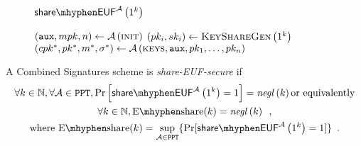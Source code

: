   \begin{figure}[!htbp]
    \begin{gamebox}{$\mathsf{share \mhyphen
    EUF}^{\adversary}\left(1^k\right)$}
      \begin{algorithmic}[1]
        \State $\left(\mathtt{aux}, mpk, n\right) \gets
        \mathcal{A}\left(\textsc{init}\right)$
          \State $\left(pk_i, sk_i\right) \gets
          \textsc{KeyShareGen}\left(1^k\right)$
        \EndFor
        \State $\left(cpk^*, pk^*, m^*, \sigma^*\right) \gets
        \mathcal{A}\left(\textsc{keys}, \mathtt{aux}, pk_1, \dots, pk_n\right)$
          \State {}
        \Else
          \State {}
        \EndIf
      \end{algorithmic}
    \end{gamebox}
    \caption{}
    \label{game:comb:share}
  \end{figure}
  \begin{definition}
    \label{def:share:secure}
    A Combined Signatures scheme is \emph{\textsf{share-EUF}-secure} if
    \begin{gather*}
      \forall k \in \mathbb{N}, \forall \adversary \in \mathtt{PPT},
      \Pr\left[\mathsf{share \mhyphen EUF}^{\adversary}\left(1^k\right) =
      1\right] = \mathit{negl}\left(k\right) \text{or equivalently} \\
      \forall k \in \mathbb{N}, \mathrm{E \mhyphen share}(k) =
      \mathit{negl}\left(k\right) \enspace, \\
      \text{where } \mathrm{E \mhyphen share}(k) = \underset{\adversary \in
      \mathtt{PPT}}{\sup}\{\Pr[\mathsf{share \mhyphen
      EUF}^{\adversary}\left(1^k\right) = 1]\} \enspace.
    \end{gather*}
  \end{definition}

